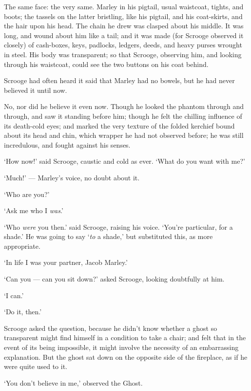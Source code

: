 \documentclass[11pt,twoside]{article}\makeatletter
\begin{document}
The same face: the very same.  Marley in his pigtail, usual waistcoat, tights, and boots; the tassels on the latter bristling, like his pigtail, and his coat-skirts, and the hair upon his head.  The chain he drew was clasped about his middle.  It was long, and wound about him like a tail; and it was made (for Scrooge observed it closely) of cash-boxes, keys, padlocks, ledgers, deeds, and heavy purses wrought in steel.  His body was transparent; so that Scrooge, observing him, and looking through his waistcoat, could see the two buttons on his coat behind.   \par
Scrooge had often heard it said that Marley had no bowels, but he had never believed it until now.  \par
No, nor did he believe it even now.  Though he looked the phantom through and through, and saw it standing before him; though he felt the chilling influence of its death-cold eyes; and marked the very texture of the folded kerchief bound about its head and chin, which wrapper he had not observed before; he was still incredulous, and fought against his senses.  \par
‘How now!’ said Scrooge, caustic and cold as ever.  ‘What do you want with me?’  \par
‘Much!’ — Marley's voice, no doubt about it.  \par
           ‘Who are you?’         \par
           ‘Ask me who I \textit{was}.’         \par
‘Who \textit{were} you then.’ said Scrooge, raising his voice.  ‘You're particular, for a shade.’ He was going to say ‘\textit{to} a shade,’ but substituted this, as more appropriate.  \par
           ‘In life I was your partner, Jacob Marley.’         \par
‘Can you — can you sit down?’ asked Scrooge, looking doubtfully at him.   \par
           ‘I can.’         \par
           ‘Do it, then.’         \par
Scrooge asked the question, because he didn't know whether a ghost so transparent might find himself in a condition to take a chair; and felt that in the event of its being impossible, it might involve the necessity of an embarrassing explanation. But the ghost sat down on the opposite side of the fireplace, as if he were quite used to it.  \par
‘You don't believe in me,’ observed the Ghost.  \par
\end{document}
